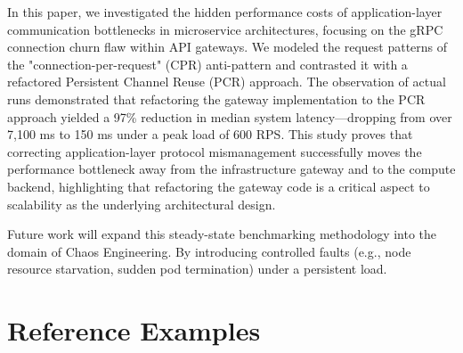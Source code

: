 \documentclass{ieeeaccess}
\begin{document}
In this paper, we investigated the hidden performance costs of application-layer communication bottlenecks in microservice architectures, focusing on the gRPC connection churn flaw within API gateways. We modeled the request patterns of the "connection-per-request" (CPR) anti-pattern and contrasted it with a refactored Persistent Channel Reuse (PCR) approach. The observation of actual runs demonstrated that refactoring the gateway implementation to the PCR approach yielded a 97\% reduction in median system latency—dropping from over 7,100 ms to 150 ms under a peak load of 600 RPS. This study proves that correcting application-layer protocol mismanagement successfully moves the performance bottleneck away from the infrastructure gateway and to the compute backend, highlighting that refactoring the gateway code is a critical aspect to scalability as the underlying architectural design.

Future work will expand this steady-state benchmarking methodology into the domain of Chaos Engineering. By introducing controlled faults (e.g., node resource starvation, sudden pod termination) under a persistent load. 



\section{Reference Examples}
\end{document}
